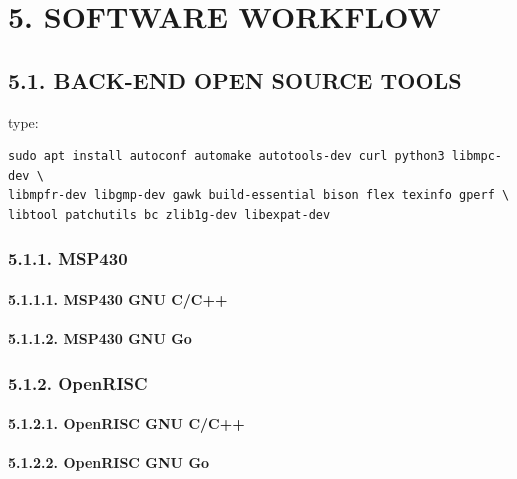 \documentclass[
]{article}
\begin{document}
\hypertarget{software-workflow}{%
\section{5. SOFTWARE WORKFLOW}\label{software-workflow}}

\hypertarget{back-end-open-source-tools-1}{%
\subsection{5.1. BACK-END OPEN SOURCE
TOOLS}\label{back-end-open-source-tools-1}}

type:

\begin{verbatim}
sudo apt install autoconf automake autotools-dev curl python3 libmpc-dev \
libmpfr-dev libgmp-dev gawk build-essential bison flex texinfo gperf \
libtool patchutils bc zlib1g-dev libexpat-dev
\end{verbatim}

\hypertarget{msp430-1}{%
\subsubsection{5.1.1. MSP430}\label{msp430-1}}

\hypertarget{msp430-gnu-cc}{%
\paragraph{5.1.1.1. MSP430 GNU C/C++}\label{msp430-gnu-cc}}

\hypertarget{msp430-gnu-go}{%
\paragraph{5.1.1.2. MSP430 GNU Go}\label{msp430-gnu-go}}

\hypertarget{openrisc-1}{%
\subsubsection{5.1.2. OpenRISC}\label{openrisc-1}}

\hypertarget{openrisc-gnu-cc}{%
\paragraph{5.1.2.1. OpenRISC GNU C/C++}\label{openrisc-gnu-cc}}

\hypertarget{openrisc-gnu-go}{%
\paragraph{5.1.2.2. OpenRISC GNU Go}\label{openrisc-gnu-go}}
\end{document}
